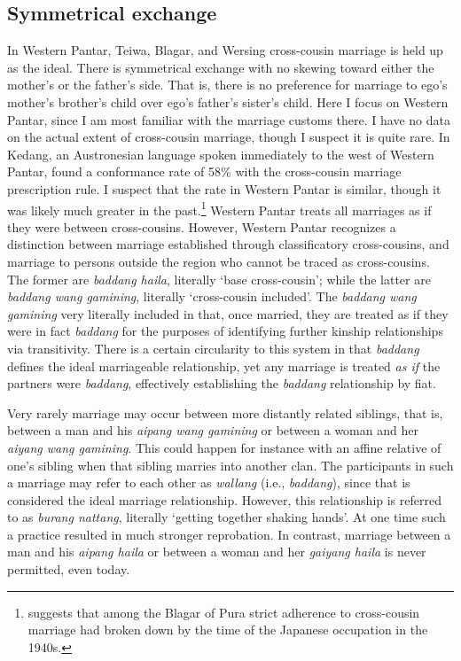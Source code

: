 \subsection{Symmetrical exchange}
In Western Pantar, Teiwa, Blagar, and Wersing cross-cousin marriage is held up as the ideal. There is symmetrical exchange with no skewing toward either the mother's or the father's side. That is, there is no preference for marriage to ego's mother's brother's child over ego's father's sister's child. Here I focus on Western Pantar, since I am most familiar with the marriage customs there. I have no data on the actual extent of cross-cousin marriage, though I suspect it is quite rare. In Kedang, an Austronesian language spoken immediately to the west of Western Pantar, \citet[88]{Barnes1980} found a conformance rate of 58\% with the cross-cousin marriage prescription rule. I suspect that the rate in Western Pantar is similar, though it was likely much greater in the past.\footnote{{ }  \citet{Steinhauer2010} suggests that among the Blagar of Pura strict adherence to cross-cousin marriage had broken down by the time of the Japanese occupation in the 1940s.} Western Pantar treats all marriages as if they were between cross-cousins. However, Western Pantar recognizes a distinction between marriage established through classificatory cross-cousins, and marriage to persons outside the region who cannot be traced as cross-cousins. The former are \textit{baddang haila}, literally `base cross-cousin'; while the latter are \textit{baddang wang gamining}, literally `cross-cousin included'. The \textit{baddang wang gamining} very literally included in that, once married, they are treated as if they were in fact \textit{baddang} for the purposes of identifying further kinship relationships via transitivity. There is a certain circularity to this system in that \textit{baddang} defines the ideal marriageable relationship, yet any marriage is treated \textit{as if} the partners were \textit{baddang}, effectively establishing the \textit{baddang} relationship by fiat.

Very rarely marriage may occur between more distantly related siblings, that is, between a man and his \textit{aipang wang gamining} or between a woman and her \textit{aiyang wang gamining}. This could happen for instance with an affine relative of one's sibling when that sibling marries into another clan. The participants in such a marriage may refer to each other as \textit{wallang} (i.e., \textit{baddang}), since that is considered the ideal marriage relationship. However, this relationship is referred to as \textit{burang nattang}, literally `getting together shaking hands'. At one time such a practice resulted in much stronger reprobation. In contrast, marriage between a man and his \textit{aipang haila} or between a woman and her \textit{gaiyang haila} is never permitted, even today.


